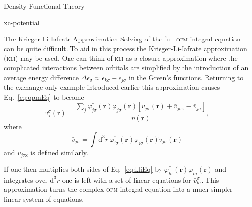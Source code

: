 \documentclass[letterpaper, 11 pt]{report}
\begin{document}
\begin{chapter}{Density Functional Theory \label{chap:dft}}
\begin{section}{xc-potential \label{sec:xcpot}}
\begin{subsection}{The Krieger-Li-Iafrate Approximation \label{sec:kli}}
         Solving of the full \textsc{opm} integral equation can be quite difficult. To aid in this
         process the Krieger-Li-Iafrate approximation~\cite{kli1} (\textsc{kli}) may be used. One can
         think of \textsc{kli} as a closure approximation where the complicated interactions between
         orbitals are simplified by the introduction of an average energy difference
         $\Delta \epsilon_\sigma \approx \epsilon_{k \sigma} - \epsilon_{j \sigma}$ in the Green's
         functions. Returning to the exchange-only example introduced earlier this approximation causes
         Eq.~\eqref{eq:opmEq} to become
         \begin{equation} \label{eq:kliEq}
            v_\mathrm{x}^\sigma(\mathrm{r}) =
               \frac{\sum\limits_{j} \varphi^*_{j \sigma} (\mathbf{r}) \varphi_{j \sigma} (\mathbf{r})
               \left[ \tilde{v}_{j \sigma}(\mathbf{r}) + \bar{v}_{j \sigma \mathrm{x}}
                                               - \bar{v}_{j \sigma} \right]}{n(\mathbf{r})},
         \end{equation}
         where
         \begin{equation}
            \bar{v}_{j \sigma} = \int \mathrm{d}^3 r \, \varphi^*_{j \sigma} (\mathbf{r})
               \varphi_{j \sigma} (\mathbf{r}) \tilde{v}_{j \sigma} (\mathbf{r})
         \end{equation}
         and $\bar{v}_{j \sigma \mathrm{x}}$ is defined similarly.

         If one then multiplies both sides of Eq.~\eqref{eq:kliEq} by $\varphi^*_{l \sigma} (\mathbf{r})
         \varphi_{l \sigma} (\mathbf{r})$ and integrates over $\mathrm{d}^3 r$ one is left with a set of
         linear equations for $\bar{v}^\sigma_{l \sigma}$. This approximation turns the complex
         \textsc{opm} integral equation into a much simpler linear system of equations.


\end{subsection}
\end{section}
\end{chapter}
\end{document}
